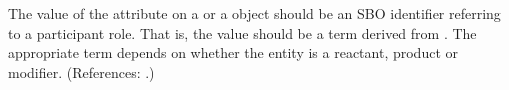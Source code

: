 The value of the attribute  on a \SpeciesReference or a
\ModifierSpeciesReference object should be an SBO identifier referring to a
participant role.  That is, the value should be a term derived from
\sboparticipantrole.  The appropriate term depends on whether the entity is
a reactant, product or modifier.  (References: .)
